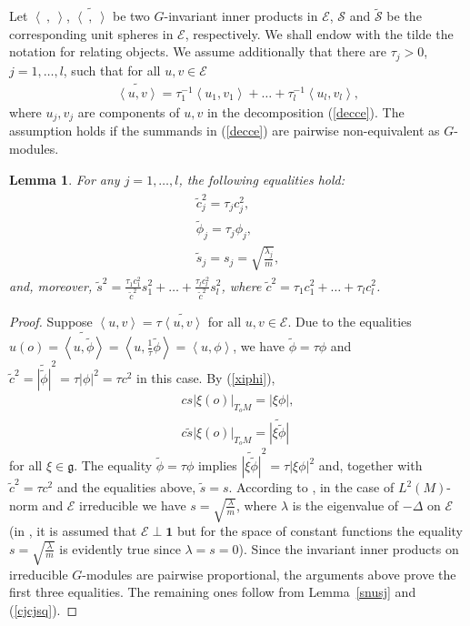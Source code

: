\documentclass[10pt]{amsart}
\newtheorem{lemma}{Lemma}
\theoremstyle{remark}
\let\td=\tilde
\let\wtd=\widetilde
\begin{document}
Let ${\left<{\ },{\ }\right>}$, $\wtd{{\left<{\ },{\ }\right>}}$ be two $G$-invariant
inner products in ${\mathcal{E}}$, ${\mathcal{S}}$ and $\wtd{\mathcal{S}}$ be the corresponding
unit spheres in ${\mathcal{E}}$, respectively. We shall endow with the tilde
the notation for relating objects. We assume additionally that
there are $\tau_j>0$, $j=1,\dots,l$, such that for all $u,v\in{\mathcal{E}}$
\begin{eqnarray}\label{nnorms}
\wtd{{\left<{u},{v}\right>}}=\tau_1^{-1}{\left<{u_1},{v_1}\right>}+
\dots+\tau_l^{-1}{\left<{u_l},{v_l}\right>},
\end{eqnarray}
where $u_j,v_j$ are components of $u,v$ in the decomposition
(\ref{decce}). The assumption holds if the summands in
(\ref{decce}) are pairwise non-equivalent as $G$-modules.

\begin{lemma}\label{eqisct}
For any $j=1,\dots,l$, the following equalities hold:
\begin{eqnarray*}
\begin{array}{r}
\td c_j^2=\tau_j c_j^2 ,\\
\td\phi_j=\tau_j\phi_j,\\
\td s_j=s_j=\sqrt{\frac{{{\mathord{\lambda}}}_j}{m}},
\end{array}
\end{eqnarray*}
and, moreover, $\td s^2=\frac{\tau_1 c_1^2}{\td c^2}s_1^2+
\dots+\frac{\tau_l c_l^2}{\td c^2}s_l^2$, where $\td c^2=\tau_1
c_1^2+\dots+\tau_l c_l^2$.
\end{lemma}
\begin{proof}
Suppose ${\left<{u},{v}\right>}=\tau\wtd{{\left<{u},{v}\right>}}$ for all $u,v\in{\mathcal{E}}$.
Due to the equalities
$u(o)=\wtd{{\left<{u},{\td\phi}\right>}}={\left<{u},{\frac1{\tau}\td\phi}\right>}
={\left<{u},{\phi}\right>}$, we have $\td\phi=\tau\phi$ and $\td
c^2=\wtd{|\td\phi|}^2=\tau|\phi|^2=\tau c^2$ in this case. By
(\ref{xiphi}),
\begin{eqnarray*}
cs|\xi(o)|_{T_oM}=|\xi\phi|,\\ 
c\td s|\xi(o)|_{T_oM}=\wtd{|\xi\td\phi|}\phantom{!}
\end{eqnarray*}
for all $\xi\in{\mathord{\mathfrak{g}}}$. The equality $\td\phi=\tau\phi$ implies
$\wtd{|\xi\td\phi|}^2=\tau|\xi\phi|^2$ and, together with $\td
c^2=\tau c^2$ and the equalities above,  $\td s=s$. According to
\cite[Lemma~1]{Gi13}, in the case of $L^2(M)$-norm and ${\mathcal{E}}$
irreducible we have $s=\sqrt{\frac{{\mathord{\lambda}}}{m}}$, where ${{\mathord{\lambda}}}$ is the
eigenvalue of $-{{\mathord{\Delta}}}$ on ${\mathcal{E}}$ (in \cite{Gi13}, it is assumed that
${\mathcal{E}}\perp{{\mathord{\mathbf1}}}$ but for the space of constant functions the
equality $s=\sqrt{\frac{{\mathord{\lambda}}}{m}}$ is evidently true since
${{\mathord{\lambda}}}=s=0$). Since the invariant inner products on irreducible
$G$-modules are pairwise proportional, the arguments above prove
the first three equalities. The remaining ones follow from
Lemma~\ref{snusj} and (\ref{cjcjsq}).
\end{proof}
\end{document}

